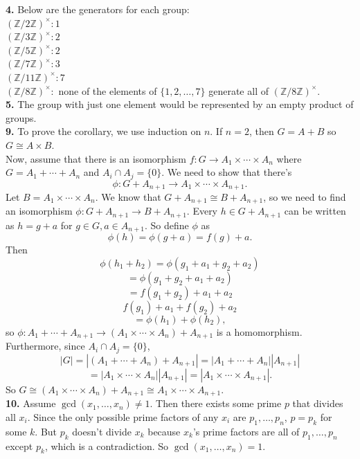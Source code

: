 \documentclass{article}
\newcommand{\Z}{\mathbb{Z}}
\begin{document}
\textbf{4.} Below are the generators for each group: \\
$(\Z/2\Z)^\times: 1$ \\
$(\Z/3\Z)^\times: 2$ \\
$(\Z/5\Z)^\times: 2$ \\
$(\Z/7\Z)^\times: 3$ \\
$(\Z/11\Z)^\times: 7$ \\
$(\Z/8\Z)^\times:$ none of the elements of $\{1, 2, \ldots, 7\}$ generate all of $(\Z/8\Z)^\times$. \\

\textbf{5.} The group with just one element would be represented by an empty product of groups. \\

\textbf{9.} To prove the corollary, we use induction on $n$. If $n = 2$, then $G = A + B$ so $G \cong A \times B$. \\

Now, assume that there is an isomorphism $f: G \to A_1 \times \cdots \times A_n$ where $G = A_1 + \cdots + A_n$ and $A_i \cap A_j = \{0\}$. We need to show that there's
$$\phi: G + A_{n + 1} \to A_1 \times \cdots \times A_{n + 1}.$$
Let $B = A_1 \times \cdots \times A_n$. We know that $G + A_{n + 1} \cong B + A_{n + 1}$, so we need to find an isomorphism $\phi: G + A_{n + 1} \to B + A_{n + 1}$. Every $h \in G + A_{n + 1}$ can be written as $h = g + a$ for $g \in G, a \in A_{n + 1}$. So define $\phi$ as
$$\phi(h) = \phi(g + a) = f(g) + a.$$
Then
$$\phi(h_1 + h_2) = \phi(g_1 + a_1 + g_2 + a_2)$$
$$= \phi(g_1 + g_2 + a_1 + a_2)$$
$$= f(g_1 + g_2) + a_1 + a_2$$
$$f(g_1) + a_1 + f(g_2) + a_2$$
$$= \phi(h_1) + \phi(h_2),$$
so $\phi: A_1 + \cdots + A_{n + 1} \to (A_1 \times \cdots \times A_n) + A_{n + 1}$ is a homomorphism. Furthermore, since $A_i \cap A_j = \{0\}$,
$$|G| = |(A_1 + \cdots + A_n) + A_{n + 1}| = |A_1 + \cdots + A_n||A_{n + 1}|$$
$$= |A_1\times \cdots \times A_n||A_{n + 1}| = |A_1\times \cdots \times A_{n + 1}|.$$
So $G \cong (A_1\times \cdots \times A_n) + A_{n + 1} \cong A_1\times \cdots \times A_{n + 1}$. \\

\textbf{10.} Assume $\gcd(x_1, \ldots, x_n) \neq 1$. Then there exists some prime $p$ that divides all $x_i$. Since the only possible prime factors of any $x_i$ are $p_1, \ldots, p_n$, $p = p_k$ for some $k$. But $p_k$ doesn't divide $x_k$ because $x_k$'s prime factors are all of $p_1, \ldots, p_n$ except $p_k$, which is a contradiction. So $\gcd(x_1, \ldots, x_n) = 1$. \\
\end{document}
